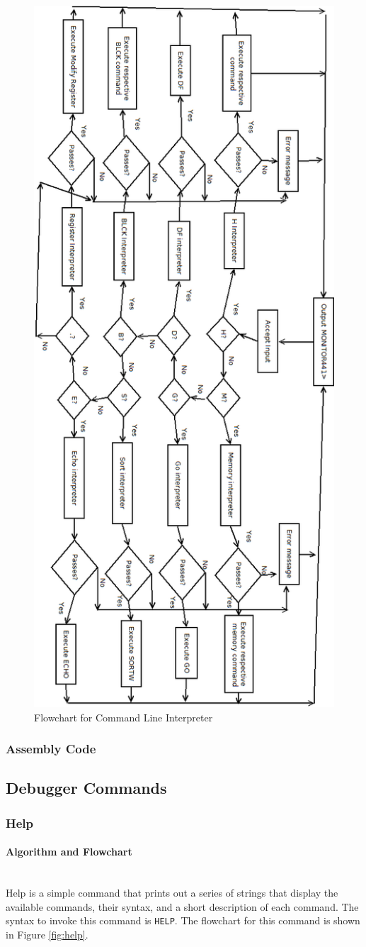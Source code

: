 \documentclass[12pt]{article}
\begin{document}
			\begin{figure}[H]
				\centering
				\includegraphics[width=.55\linewidth]{commandint}
				\caption{Flowchart for Command Line Interpreter}
				\label{fig:commandint}
			\end{figure}
			
			\subsubsection{Assembly Code}
			
			\subsection{Debugger Commands}
			\subsubsection{Help}
			\paragraph{Algorithm and Flowchart}~\\
			Help is a simple command that prints out a series of strings that display the available commands, their syntax, and a short description of each command. The syntax to invoke this command is \texttt{HELP}. The flowchart for this command is shown in Figure \ref{fig:help}.
			
\end{document}
